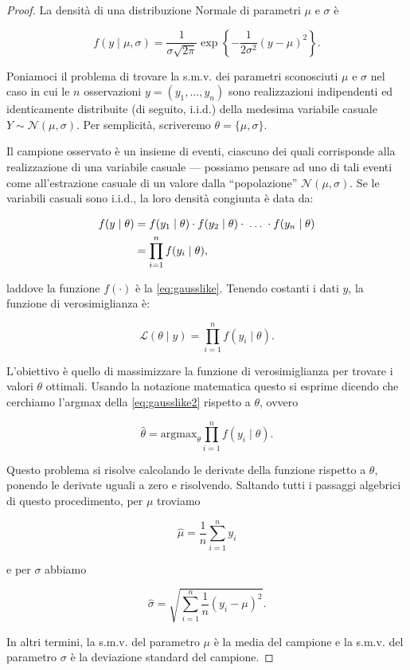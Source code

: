 \documentclass[
  11pt,
]{krantz}
\theoremstyle{definition}
\theoremstyle{definition}
\theoremstyle{definition}
\theoremstyle{definition}
\theoremstyle{remark}
\begin{document}
\begin{proof}
La densità di una distribuzione Normale di parametri \(\mu\) e \(\sigma\) è

\[
f(y \mid \mu, \sigma) = \frac{1}{\sigma \sqrt{2\pi}} \exp\left\{-\frac{1}{2\sigma^2}(y-\mu)^2\right\}.
\label{eq:gausslike}
\]

Poniamoci il problema di trovare la s.m.v. dei parametri sconosciuti \(\mu\) e \(\sigma\) nel caso in cui le \(n\) osservazioni \(y = (y_1, \dots, y_n)\) sono realizzazioni indipendenti ed identicamente distribuite (di seguito, i.i.d.) della medesima variabile casuale \(Y \sim \mathcal{N}(\mu, \sigma)\). Per semplicità, scriveremo \(\theta = \{\mu, \sigma\}.\)

Il campione osservato è un insieme di eventi, ciascuno dei quali corrisponde alla realizzazione di una variabile casuale --- possiamo pensare ad uno di tali eventi come all'estrazione casuale di un valore dalla ``popolazione'' \(\mathcal{N}(\mu, \sigma)\). Se le variabili casuali sono i.i.d., la loro densità congiunta è data da:

\begin{align}
f(y \mid \theta) &= f(y_1 \mid \theta) \cdot f(y_2 \mid \theta) \cdot \; \dots \; \cdot f(y_n \mid \theta)\notag\\
                 &= \prod_{i=1}^n f(y_i \mid \theta),
\label{eq:gauss-prob-cong}
\end{align}

laddove la funzione \(f(\cdot)\) è la \eqref{eq:gausslike}. Tenendo costanti i dati \(y\), la funzione di verosimiglianza è:

\begin{equation}
\mathcal{L}(\theta \mid y) = \prod_{i=1}^n f(y_i \mid \theta).
\label{eq:gausslike2}
\end{equation}

L'obiettivo è quello di massimizzare la funzione di verosimiglianza per trovare i valori \(\theta\) ottimali. Usando la notazione matematica questo si esprime dicendo che cerchiamo l'argmax della \eqref{eq:gausslike2} rispetto a \(\theta\), ovvero

\[
\hat{\theta} = \text{argmax}_{\theta} \prod_{i=1}^n f(y_i \mid \theta).
\]

Questo problema si risolve calcolando le derivate della funzione rispetto a \(\theta\), ponendo le derivate uguali a zero e risolvendo. Saltando tutti i passaggi algebrici di questo procedimento, per \(\mu\) troviamo

\begin{equation}
\hat{\mu} = \frac{1}{n} \sum_{i=1}^n y_i
\label{eq:maxlikemu}
\end{equation}

e per \(\sigma\) abbiamo

\begin{equation}
\hat{\sigma} = \sqrt{\sum_{i=1}^n\frac{1}{n}(y_i- \mu)^2}.
\label{eq:maxlikesigma}
\end{equation}

In altri termini, la s.m.v. del parametro \(\mu\) è la media del campione e la s.m.v. del parametro \(\sigma\) è la deviazione standard del campione.
\end{proof}
\end{document}
